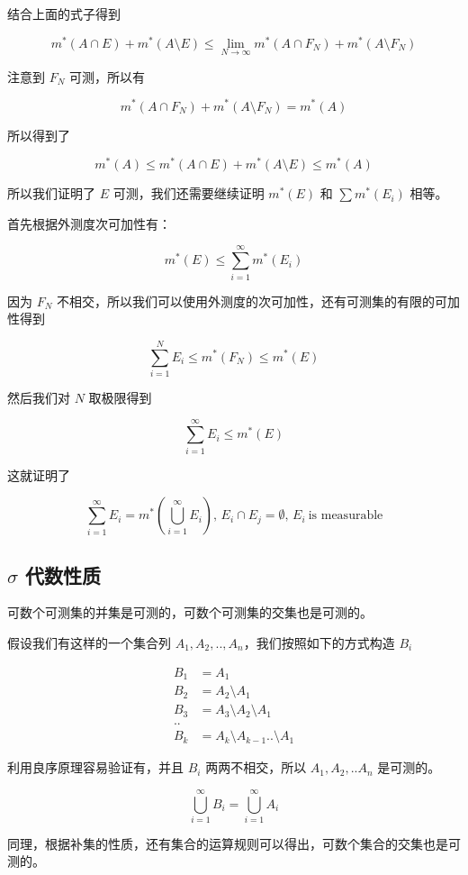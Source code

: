 结合上面的式子得到

\[
m^*(A \cap E) + m^*(A \setminus E) \le \lim_{N \to \infty}m^*(A \cap F_N) + m^*(A \setminus F_N)
\]

注意到 $F_N$ 可测，所以有

\[
m^*(A \cap F_N) + m^*(A \setminus F_N) = m^*(A)
\]

所以得到了

\[
m^*(A) \le m^*(A \cap E) + m^*(A \setminus E) \le m^*(A)
\]

所以我们证明了 $E$ 可测，我们还需要继续证明 $m^*(E)$ 和 $\sum m^*(E_i)$ 相等。

首先根据外测度次可加性有：

\[
m^*(E) \le \sum_{i=1}^{\infty}m^*(E_i)
\]

因为 $F_N$ 不相交，所以我们可以使用外测度的次可加性，还有可测集的有限的可加性得到

\[
\sum_{i=1}^{N}E_i \le m^*(F_N) \le m^*(E)
\]

然后我们对 $N$ 取极限得到

\[
\sum_{i=1}^{\infty}E_i \le m^*(E)
\]

这就证明了

\[
\sum_{i=1}^{\infty}E_i = m^*(\bigcup_{i=1}^{\infty}E_i) ,\, E_i \cap E_j = \emptyset ,\, E_i \:\text{is measurable}
\]

\subsection{$\sigma$ 代数性质}

可数个可测集的并集是可测的，可数个可测集的交集也是可测的。

假设我们有这样的一个集合列 $A_1, A_2, .., A_n$，我们按照如下的方式构造 $B_i$

\begin{align*}
    B_1 &= A_1 \\
    B_2 &= A_2 \setminus A_1 \\
    B_3 &= A_3 \setminus A_2 \setminus A_1 \\
    .. & \\
    B_k &= A_k \setminus A_{k-1} .. \setminus A_1
\end{align*}

利用良序原理容易验证有，并且 $B_i$ 两两不相交，所以 $A_1, A_2, .. A_n$ 是可测的。

\[
\bigcup_{i=1}^{\infty}B_i = \bigcup_{i=1}^{\infty}A_i
\]

同理，根据补集的性质，还有集合的运算规则可以得出，可数个集合的交集也是可测的。

